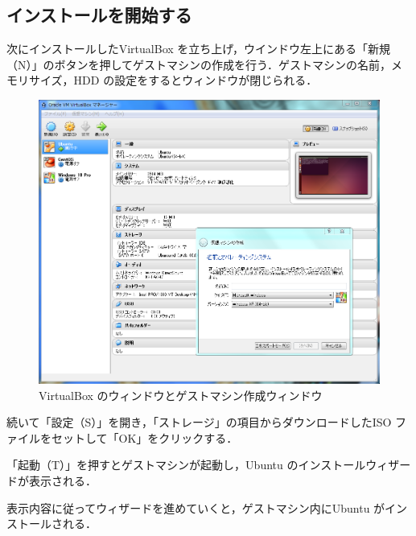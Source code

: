 \subsection{インストールを開始する}

次にインストールしたVirtualBox を立ち上げ，ウインドウ左上にある「新規（N）」のボタンを押してゲストマシンの作成を行う．ゲストマシンの名前，メモリサイズ，HDD の設定をするとウィンドウが閉じられる．

\begin{figure}[H]
\centering
\includegraphics[width=12cm]{VBoxWindow.PNG}
\caption{VirtualBox のウィンドウとゲストマシン作成ウィンドウ}\label{サンプル図}
\end{figure}

続いて「設定（S）」を開き，「ストレージ」の項目からダウンロードしたISO ファイルをセットして「OK」をクリックする．

「起動（T）」を押すとゲストマシンが起動し，Ubuntu のインストールウィザードが表示される．

表示内容に従ってウィザードを進めていくと，ゲストマシン内にUbuntu がインストールされる．


